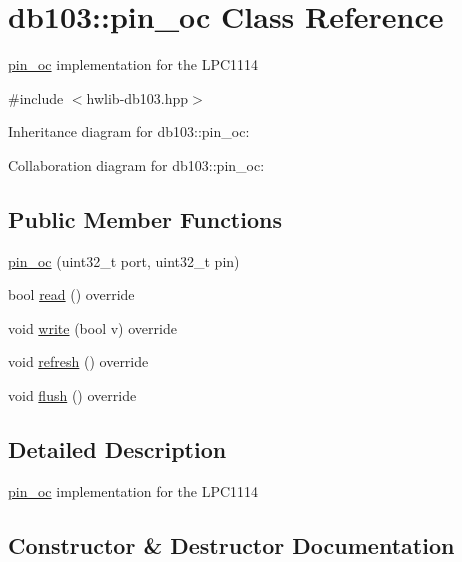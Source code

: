 \hypertarget{classdb103_1_1pin__oc}{}\section{db103\+:\+:pin\+\_\+oc Class Reference}
\label{classdb103_1_1pin__oc}


\hyperlink{classdb103_1_1pin__oc}{pin\+\_\+oc} implementation for the L\+P\+C1114  




{\ttfamily \#include $<$hwlib-\/db103.\+hpp$>$}



Inheritance diagram for db103\+:\+:pin\+\_\+oc\+:


Collaboration diagram for db103\+:\+:pin\+\_\+oc\+:
\subsection*{Public Member Functions}
\begin{DoxyCompactItemize}
\item 
\hyperlink{classdb103_1_1pin__oc_a7cd264bed695dc067ecde6e452b3592f}{pin\+\_\+oc} (uint32\+\_\+t port, uint32\+\_\+t pin)
\item 
bool \hyperlink{classdb103_1_1pin__oc_ae48de2077c383bcab947278ee6564398}{read} () override
\item 
void \hyperlink{classdb103_1_1pin__oc_a77912a9a646cb67030854d69d911acbd}{write} (bool v) override
\item 
void \hyperlink{classdb103_1_1pin__oc_af033054181da84fd2392f611ca391ee3}{refresh} () override
\item 
void \hyperlink{classdb103_1_1pin__oc_a9aa19305905fe3a647fe1fa50a243dae}{flush} () override
\end{DoxyCompactItemize}


\subsection{Detailed Description}
\hyperlink{classdb103_1_1pin__oc}{pin\+\_\+oc} implementation for the L\+P\+C1114 

\subsection{Constructor \& Destructor Documentation}
\mbox{\label{classdb103_1_1pin__oc_a7cd264bed695dc067ecde6e452b3592f}} 
